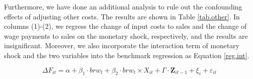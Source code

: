 Furthermore, we have done an additional analysis to rule out the confounding effects of adjusting other costs. The results are shown in Table \ref{tab.other}. In columns (1)-(2), we regress the change of input costs to sales and the change of wage payments to sales on the monetary shock, respectively, and the results are insignificant. Moreover, we also incorporate the interaction term of monetary shock and the two variables into the benchmark regression as Equation \ref{reg.int}. 

\begin{equation}
    \Delta F_{it} = \alpha +\beta_1 \cdot brw_{t} +\beta_2 \cdot brw_{t} \times X_{it}+ \Gamma \cdot \textbf{Z}_{it-1}+\xi_{i}+\varepsilon_{it} \label{reg.int}
\end{equation}

\begin{table}[htbp]
    \centering
    \caption{Discussion about other production costs}
\end{table}
